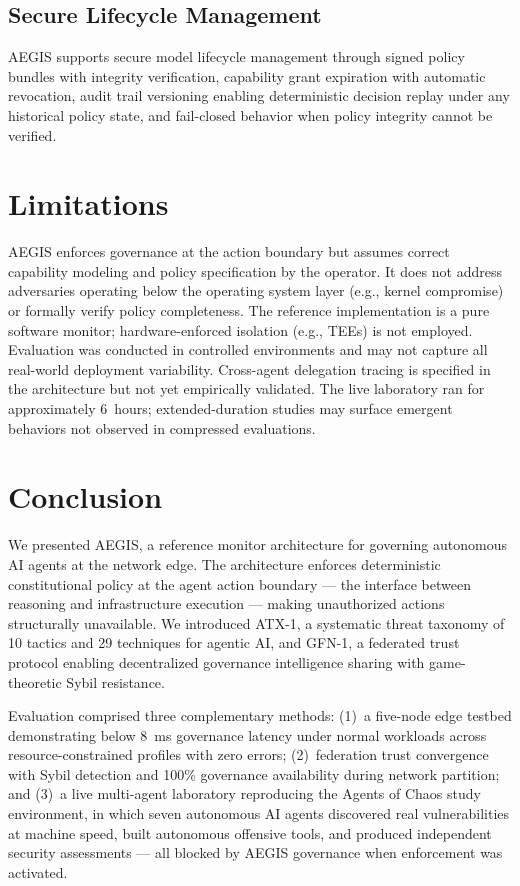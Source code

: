 \documentclass[journal]{IEEEtran}
\begin{document}
\subsection{Secure Lifecycle Management}

AEGIS supports secure model lifecycle management through signed policy bundles with integrity verification, capability grant expiration with automatic revocation, audit trail versioning enabling deterministic decision replay under any historical policy state, and fail-closed behavior when policy integrity cannot be verified.

\section{Limitations}

AEGIS enforces governance at the action boundary but assumes correct capability modeling and policy specification by the operator. It does not address adversaries operating below the operating system layer (e.g., kernel compromise) or formally verify policy completeness. The reference implementation is a pure software monitor; hardware-enforced isolation (e.g., TEEs) is not employed. Evaluation was conducted in controlled environments and may not capture all real-world deployment variability. Cross-agent delegation tracing is specified in the architecture but not yet empirically validated. The live laboratory ran for approximately 6~hours; extended-duration studies may surface emergent behaviors not observed in compressed evaluations.

\section{Conclusion}

We presented AEGIS, a reference monitor architecture for governing autonomous AI agents at the network edge. The architecture enforces deterministic constitutional policy at the agent action boundary --- the interface between reasoning and infrastructure execution --- making unauthorized actions structurally unavailable. We introduced ATX-1, a systematic threat taxonomy of 10 tactics and 29 techniques for agentic AI, and GFN-1, a federated trust protocol enabling decentralized governance intelligence sharing with game-theoretic Sybil resistance.

Evaluation comprised three complementary methods: (1)~a five-node edge testbed demonstrating below 8~ms governance latency under normal workloads across resource-constrained profiles with zero errors; (2)~federation trust convergence with Sybil detection and 100\% governance availability during network partition; and (3)~a live multi-agent laboratory reproducing the Agents of Chaos study environment, in which seven autonomous AI agents discovered real vulnerabilities at machine speed, built autonomous offensive tools, and produced independent security assessments --- all blocked by AEGIS governance when enforcement was activated.
\end{document}
